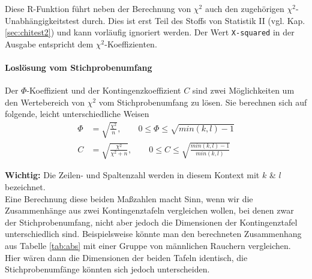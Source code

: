 \documentclass[a4paper]{article}
\newcommand\dangersign[1][2ex]{%
  \renewcommand\stacktype{L}%
  \scaleto{\stackon[1.3pt]{\color{red}$\triangle$}{\tiny !}}{#1}%
}
\begin{document}
\noindent {}

\noindent \dangersign[3ex] Diese R-Funktion führt neben der Berechnung von $\chi^2$ auch den zugehörigen $\chi^2$-Unabhängigkeits\-test durch. Dies ist erst Teil des Stoffs von Statistik II (vgl. Kap. \ref{sec:chitest2}) und kann vorläufig ignoriert werden. Der Wert \texttt{X-squared} in der Ausgabe entspricht dem $\chi^2$-Koeffizienten.

\paragraph{Loslösung vom Stichprobenumfang}
Der $\Phi$-Koeffizient und der Kontingenzkoeffizient $C$ sind zwei Möglichkeiten um den Wertebereich von $\chi^2$ vom Stichprobenumfang zu lösen. Sie berechnen sich auf folgende, leicht unterschiedliche Weisen
\begin{align*}
    \Phi &= \sqrt{\frac{\chi^2}{n}}, \qquad 0 \leq \Phi \leq \sqrt{min(k,l)-1}\\
    C &= \sqrt{\frac{\chi^2}{\chi^2 + n}}, \qquad 0 \leq C \leq \sqrt{\frac{min(k,l)-1}{min(k,l)}}
\end{align*}

\noindent \dangersign[3ex] \textbf{Wichtig:} Die Zeilen- und Spaltenzahl werden in diesem Kontext mit $k$ \& $l$ bezeichnet.\\

\noindent Eine Berechnung diese beiden Maßzahlen macht Sinn, wenn wir die Zusammenhänge aus zwei Kontingenztafeln vergleichen wollen, bei denen zwar der Stichprobenumfang, nicht aber jedoch die Dimensionen der Kontingenztafel unterschiedlich sind. Beispielsweise könnte man den berechneten Zusammenhang aus Tabelle \ref{tab:abs} mit einer Gruppe von männlichen Rauchern vergleichen. Hier wären dann die Dimensionen der beiden Tafeln identisch, die Stichprobenumfänge könnten sich jedoch unterscheiden.\\

\noindent {}\\
\noindent {}
\end{document}
